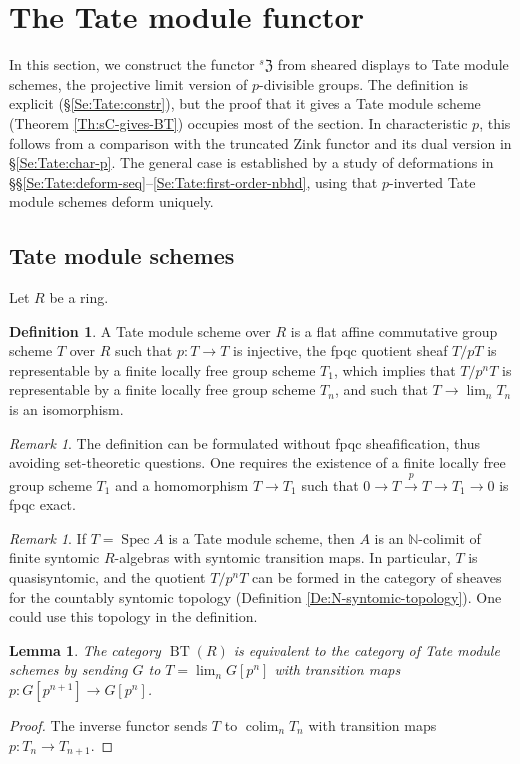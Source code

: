 \documentclass[a4paper,11pt]{amsart}
\theoremstyle{plain}
\newtheorem{Lemma}[equation]{Lemma}
\theoremstyle{definition}
\newtheorem{Defn}[equation]{Definition}
\theoremstyle{remark}
\newtheorem{Remark}[equation]{Remark}
\newcommand{\bLe}{\begin{Lemma}}
\newcommand{\eLe}{\end{Lemma}}
\newcommand{\bDe}{\begin{Defn}}
\newcommand{\eDe}{\end{Defn}}
\newcommand{\bRe}{\begin{Remark}}
\newcommand{\eRe}{\end{Remark}}
\newcommand{\bproof}{\begin{proof}}
\newcommand{\eproof}{\end{proof}}
\numberwithin{equation}{section}
\newcommand{\FZ}{\mathfrak{Z}}
\newcommand{\NN}{{\mathbb{N}}}
\DeclareMathOperator{\colim}{colim}
\DeclareMathOperator{\BT}{BT}
\DeclareMathOperator{\Spec}{Spec}
\newcommand{\sFZ}{{}^s\FZ}
\begin{document}
\section{The Tate module functor}
\label{Se:Tate}

In this section, we construct the functor $\sFZ$ from sheared displays to Tate module schemes, the projective limit version of $p$-divisible groups. The definition is explicit (\S\ref{Se:Tate:constr}), but the proof that it gives a Tate module scheme (Theorem \ref{Th:sC-gives-BT}) occupies most of the section. In characteristic $p$, this follows from a comparison with the truncated Zink functor and its dual version in \S\ref{Se:Tate:char-p}. The general case is established by a study of deformations in \S\S\ref{Se:Tate:deform-seq}--\ref{Se:Tate:first-order-nbhd}, using that $p$-inverted Tate module schemes deform uniquely.

\subsection{Tate module schemes}

Let $R$ be a ring.

\bDe
A Tate module scheme over $R$ is a flat affine commutative group scheme $T$ over $R$ such that $p\colon T\to T$ is injective, the fpqc quotient sheaf $T/pT$ is representable by a finite locally free group scheme $T_1$, which implies that $T/p^nT$ is representable by a finite locally free group scheme $T_n$, and such that $T\to\lim_n T_n$ is an isomorphism.
\eDe

\bRe
The definition can be formulated without fpqc sheafification, thus avoiding set-theoretic questions. One requires the existence of a finite locally free group scheme $T_1$ and a homomorphism $T\to T_1$ such that $0\to T\xrightarrow pT\to T_1\to 0$ is fpqc exact.
\eRe

\bRe
If $T=\Spec A$ is a Tate module scheme, then $A$ is an $\NN$-colimit of finite syntomic $R$-algebras with syntomic transition maps. In particular, $T$ is quasisyntomic, and the quotient $T/p^nT$ can be formed in the category of sheaves for the countably syntomic topology (Definition \ref{De:N-syntomic-topology}). One could use this topology in the definition.
\eRe

\bLe
The category $\BT(R)$ is equivalent to the category of Tate module schemes by sending $G$ to $T=\lim_n G[p^n]$ with transition maps $p\colon G[p^{n+1}]\to G[p^n]$.
\eLe

\bproof The inverse functor sends $T$ to $\colim_n T_n$ with transition maps $p\colon T_n\to T_{n+1}$.
\eproof
\end{document}
